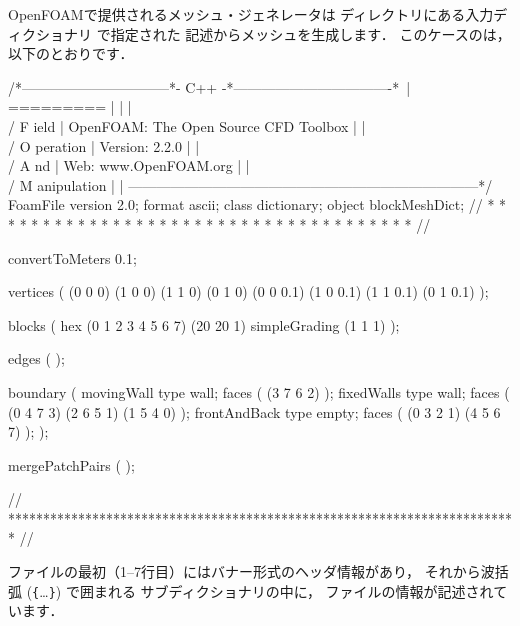OpenFOAMで提供されるメッシュ・ジェネレータは
ディレクトリにある入力ディクショナリ
%
%
で指定された
記述からメッシュを生成します．
このケースのは，以下のとおりです．
\begin{OFverbatim}
/*--------------------------------*- C++ -*----------------------------------*\
| =========                 |                                                 |
| \\      /  F ield         | OpenFOAM: The Open Source CFD Toolbox           |
|  \\    /   O peration     | Version:  2.2.0                                 |
|   \\  /    A nd           | Web:      www.OpenFOAM.org                      |
|    \\/     M anipulation  |                                                 |
\*---------------------------------------------------------------------------*/
FoamFile
{
    version     2.0;
    format      ascii;
    class       dictionary;
    object      blockMeshDict;
}
// * * * * * * * * * * * * * * * * * * * * * * * * * * * * * * * * * * * * * //

convertToMeters 0.1;

vertices        
(
    (0 0 0)
    (1 0 0)
    (1 1 0)
    (0 1 0)
    (0 0 0.1)
    (1 0 0.1)
    (1 1 0.1)
    (0 1 0.1)
);

blocks          
(
    hex (0 1 2 3 4 5 6 7) (20 20 1) simpleGrading (1 1 1)
);

edges           
(
);

boundary
(
    movingWall 
    {
        type wall;
        faces
        (
            (3 7 6 2)
        );
    }
    fixedWalls 
    {
        type wall;
        faces
        (
            (0 4 7 3)
            (2 6 5 1)
            (1 5 4 0)
        );
    }
    frontAndBack 
    {
        type empty;
        faces
        (
            (0 3 2 1)
            (4 5 6 7)
        );
    }
);

mergePatchPairs 
(
);

// ************************************************************************* //
\end{OFverbatim}
ファイルの最初（1--7行目）にはバナー形式のヘッダ情報があり，
それから波括弧 (\verb|{|\ldots\verb|}|) で囲まれる
サブディクショナリの中に，
ファイルの情報が記述されています．

